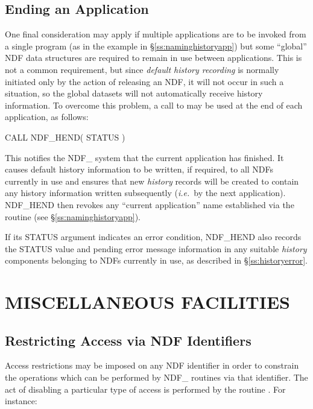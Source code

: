\documentclass[twoside,11pt,nolof]{starlink}
\providecommand{\st}[1]{{\emph{#1}}}
\begin{document}
\subsection{\label{ss:endhistory}Ending an Application}

One final consideration may apply if multiple applications are to be
invoked from a single program (as in the example in
\S\ref{ss:naminghistoryapp}) but some ``global'' NDF data structures
are required to remain in use between applications. This is not a common
requirement, but since \st{default history recording\/} is normally initiated
only by the action of releasing an NDF, it will not occur in such a
situation, so the global datasets will not automatically receive
history information. To overcome this problem, a call to  may
be used at the end of each application, as follows:

\small
\begin{terminalv}
      CALL NDF_HEND( STATUS )
\end{terminalv}
\normalsize

This notifies the NDF\_ system that the current application has
finished. It causes default history information to be written, if
required, to all NDFs currently in use and ensures that new
\st{history\/} records will be created to contain any history
information
written subsequently (\st{i.e.}\ by the next application). NDF\_HEND
then revokes any ``current application'' name established via the
 routine (see \S\ref{ss:naminghistoryapp}).

If its STATUS argument indicates an error condition, NDF\_HEND also
records the STATUS value and pending error message information in any
suitable \st{history\/} components belonging to NDFs currently in
use, as described in \S\ref{ss:historyerror}.


\section{MISCELLANEOUS FACILITIES}

\subsection{\label{ss:restrictingaccess}Restricting Access via NDF Identifiers}

Access restrictions may be imposed on any NDF identifier in order to
constrain the operations which can be performed by NDF\_ routines via that
identifier.
The act of disabling a particular type of access is performed by the routine
.
For instance:
\end{document}

